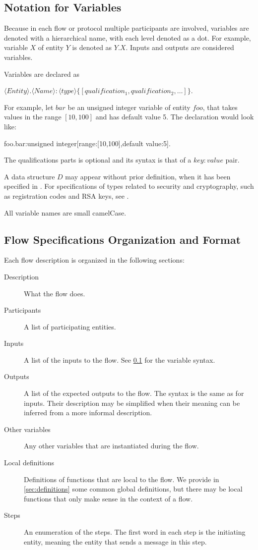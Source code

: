 \documentclass[a4paper,10pt,draft]{article}
\begin{document}
\subsection{Notation for Variables}
\label{sec:variable_notation}
Because in each flow or protocol multiple participants are involved, variables are denoted with a hierarchical name, with each level denoted as a dot. For example, variable $X$ of 
entity $Y$ is denoted as $Y.X$. Inputs and outputs are considered variables.

Variables are declared as
\begin{center}
$\langle Entity\rangle.\langle Name\rangle:\langle type\rangle\{[qualification_1, qualification_2, \dots]\}$.
\end{center}

For example, let $bar$ be an unsigned integer variable of entity $foo$, that takes values in the range $[10,100]$ and has default value 5. The declaration would look like:

\begin{center}
 foo.bar:unsigned integer[range:[10,100],default value:5].
\end{center}

The qualifications parts is optional and its syntax is that of a $key:value$ pair.

A data structure $D$ may appear without prior definition, when it has been specified in \cite{data_structure_spec}. For specifications of types related to security and 
cryptography, such as registration codes and RSA keys, see \cite{crypto_spec}.

All variable names are small camelCase.

\subsection{Flow Specifications Organization and 
Format}\label{sec:flow_spec_def}
Each flow description is organized in the following sections:

\begin{description}
 \item[Description] What the flow does.
 \item[Participants] A list of participating entities.
 \item[Inputs] A list of the inputs to the flow. See \ref{sec:variable_notation} for the variable syntax.
 \item[Outputs] A list of the expected outputs to the flow. The syntax is the same as for inputs. Their description may be simplified when their meaning can be inferred from a 
more informal description.
 \item[Other variables] Any other variables that are instantiated during the flow.
 \item[Local definitions] Definitions of functions that are local to the flow. We provide in \ref{sec:definitions} some common global definitions, but there may be local functions 
that only make sense in the context of a flow.
 \item[Steps] An enumeration of the steps. The first word in each step is the initiating entity, meaning the entity that sends a message in this step.
\end{description}
\end{document}
